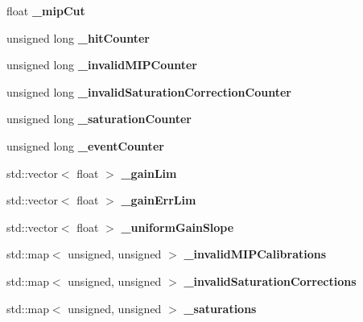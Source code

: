 \begin{DoxyCompactItemize}
\item 
float {\bfseries \_\-mipCut}\label{classCALICE_1_1IntegratedScECALCalibrationProcessor_a9aa1b3b1267dfb7d9f93779f365171e2}

\item 
unsigned long {\bfseries \_\-hitCounter}\label{classCALICE_1_1IntegratedScECALCalibrationProcessor_ae7f0adccf76ae6c22c6e5f748d8c9899}

\item 
unsigned long {\bfseries \_\-invalidMIPCounter}\label{classCALICE_1_1IntegratedScECALCalibrationProcessor_a32073bf9073c927af764495b53a0dc97}

\item 
unsigned long {\bfseries \_\-invalidSaturationCorrectionCounter}\label{classCALICE_1_1IntegratedScECALCalibrationProcessor_a99fd828abc1342d785aaf6a68d78a94b}

\item 
unsigned long {\bfseries \_\-saturationCounter}\label{classCALICE_1_1IntegratedScECALCalibrationProcessor_a2d2db54c3e186e77f0f3a02ce8bf2254}

\item 
unsigned long {\bfseries \_\-eventCounter}\label{classCALICE_1_1IntegratedScECALCalibrationProcessor_a934d12f20ce5258bd13386757d521b0f}

\item 
std::vector$<$ float $>$ {\bfseries \_\-gainLim}\label{classCALICE_1_1IntegratedScECALCalibrationProcessor_a11b496da02ff2a2fe2b96fdd4b4dde44}

\item 
std::vector$<$ float $>$ {\bfseries \_\-gainErrLim}\label{classCALICE_1_1IntegratedScECALCalibrationProcessor_a0eda6f27afb85a12b296cbc9340d2459}

\item 
std::vector$<$ float $>$ {\bfseries \_\-uniformGainSlope}\label{classCALICE_1_1IntegratedScECALCalibrationProcessor_a42ae562273b47e5733ea2d3c2473a68c}

\item 
std::map$<$ unsigned, unsigned $>$ {\bfseries \_\-invalidMIPCalibrations}\label{classCALICE_1_1IntegratedScECALCalibrationProcessor_a2699b026f88dd2671d112a050ba71b03}

\item 
std::map$<$ unsigned, unsigned $>$ {\bfseries \_\-invalidSaturationCorrections}\label{classCALICE_1_1IntegratedScECALCalibrationProcessor_a14bbf47f43ebe5e33683b1d47ef4b45d}

\item 
std::map$<$ unsigned, unsigned $>$ {\bfseries \_\-saturations}\label{classCALICE_1_1IntegratedScECALCalibrationProcessor_ac6a2ff79eb4fab82925e36edae58d22a}


\end{DoxyCompactItemize}
